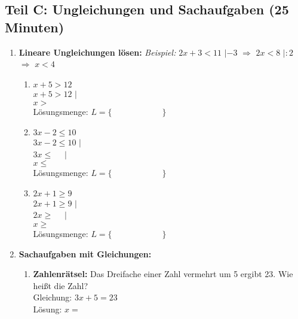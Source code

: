 \subsection*{Teil C: Ungleichungen und Sachaufgaben (25 Minuten)}

\begin{enumerate}[label=\arabic*.]

    \item \textbf{Lineare Ungleichungen lösen:}
    \textit{Beispiel:} $2x + 3 < 11$ $|-3$ $\Rightarrow$ $2x < 8$ $|:2$ $\Rightarrow$ $x < 4$
    \vspace{0.5cm}

    \begin{enumerate}[label=\alph*)]
        \item $x + 5 > 12$ \\
        $x + 5 > 12$ $|\phantom{00}$ \\
        $x > \phantom{00}$ \\
        Lösungsmenge: $L = \{\phantom{000000000000}\}$
        \vspace{0.5cm}

        \item $3x - 2 \leq 10$ \\
        $3x - 2 \leq 10$ $|\phantom{00}$ \\
        $3x \leq \phantom{00}$ $|\phantom{00}$ \\
        $x \leq \phantom{00}$ \\
        Lösungsmenge: $L = \{\phantom{000000000000}\}$
        \vspace{0.5cm}

        \item $2x + 1 \geq 9$ \\
        $2x + 1 \geq 9$ $|\phantom{00}$ \\
        $2x \geq \phantom{00}$ $|\phantom{00}$ \\
        $x \geq \phantom{00}$ \\
        Lösungsmenge: $L = \{\phantom{000000000000}\}$
    \end{enumerate}

    \vspace{1cm}

    \item \textbf{Sachaufgaben mit Gleichungen:}
    \vspace{0.5cm}

    \begin{enumerate}[label=\alph*)]
        \item \textbf{Zahlenrätsel:} Das Dreifache einer Zahl vermehrt um 5 ergibt 23. Wie heißt die Zahl? \\
        Gleichung: $3x + 5 = 23$ \\
        Lösung: $x = \phantom{00}$
        \vspace{0.5cm}


\end{enumerate}
\end{enumerate}
